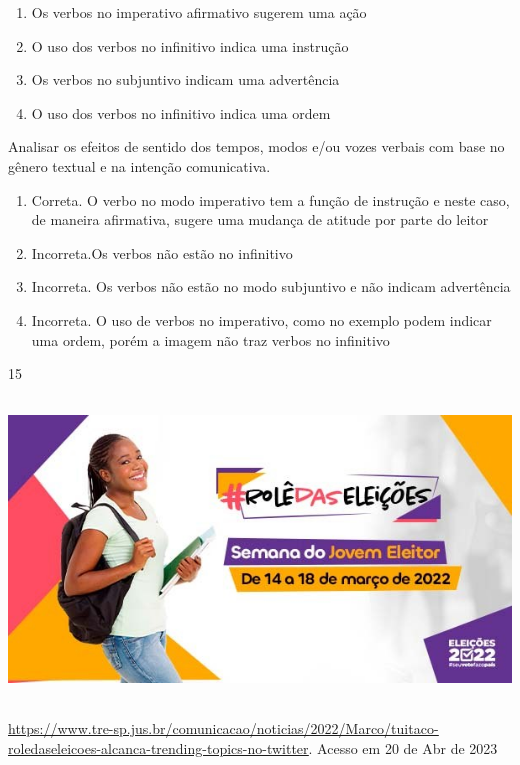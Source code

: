 {{\begin{itemize}
\begin{itemize}
\begin{enumerate}
\def\labelenumi{\alph{enumi})}
\item
  Os verbos no imperativo afirmativo sugerem uma ação
\item
  O uso dos verbos no infinitivo indica uma instrução
\item
  Os verbos no subjuntivo indicam uma advertência
\item
  O uso dos verbos no infinitivo indica uma ordem
\end{enumerate}

Analisar os efeitos de sentido dos tempos, modos e/ou vozes verbais com
base no gênero textual e na intenção comunicativa.

\begin{enumerate}
\def\labelenumi{\arabic{enumi}.}
\item
  Correta. O verbo no modo imperativo tem a função de instrução e neste
  caso, de maneira afirmativa, sugere uma mudança de atitude por parte
  do leitor
\item
  Incorreta.Os verbos não estão no infinitivo
\item
  Incorreta. Os verbos não estão no modo subjuntivo e não indicam
  advertência
\item
  Incorreta. O uso de verbos no imperativo, como no exemplo podem
  indicar uma ordem, porém a imagem não traz verbos no infinitivo
\end{enumerate}

\num{15}

\includegraphics[width=5.90551in,height=3.15278in]{./imgSAEB_7_POR/media/image20.png}

\href{https://www.tre-sp.jus.br/comunicacao/noticias/2022/Marco/tuitaco-roledaseleicoes-alcanca-trending-topics-no-twitter}{\uline{https://www.tre-sp.jus.br/comunicacao/noticias/2022/Marco/tuitaco-roledaseleicoes-alcanca-trending-topics-no-twitter}}.
Acesso em 20 de Abr de 2023


\end{itemize}
\end{itemize}}}
